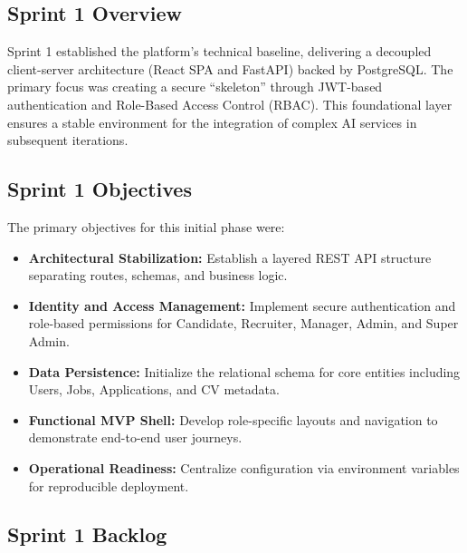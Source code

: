 \subsection{Sprint 1 Overview}
Sprint 1 established the platform's technical baseline, delivering a decoupled client-server architecture (React SPA and FastAPI) backed by PostgreSQL. The primary focus was creating a secure ``skeleton'' through JWT-based authentication and Role-Based Access Control (RBAC). This foundational layer ensures a stable environment for the integration of complex AI services in subsequent iterations.

\subsection{Sprint 1 Objectives}
The primary objectives for this initial phase were:
\begin{itemize}[leftmargin=*]
    \item \textbf{Architectural Stabilization:} Establish a layered REST API structure separating routes, schemas, and business logic.
    \item \textbf{Identity and Access Management:} Implement secure authentication and role-based permissions for Candidate, Recruiter, Manager, Admin, and Super Admin.
    \item \textbf{Data Persistence:} Initialize the relational schema for core entities including Users, Jobs, Applications, and CV metadata.
    \item \textbf{Functional MVP Shell:} Develop role-specific layouts and navigation to demonstrate end-to-end user journeys.
    \item \textbf{Operational Readiness:} Centralize configuration via environment variables for reproducible deployment.
\end{itemize}

\subsection{Sprint 1 Backlog}

